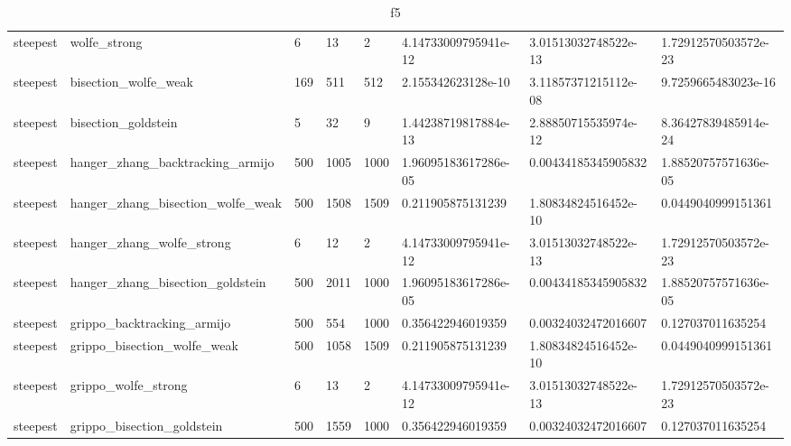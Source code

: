 \documentclass[a4paper,11pt]{article}
\numberwithin{equation}{section} %
\begin{document}
\begin{table}[h!]
{\begin{tabular}{|l|l|l|l|l|l|l|l|}
        steepest & wolfe\_strong & 6 & 13 & 2 & 4.14733009795941e-12 & 3.01513032748522e-13 & 1.72912570503572e-23 \\
        steepest & bisection\_wolfe\_weak & 169 & 511 & 512 & 2.155342623128e-10 & 3.11857371215112e-08 & 9.7259665483023e-16 \\
        steepest & bisection\_goldstein & 5 & 32 & 9 & 1.44238719817884e-13 & 2.88850715535974e-12 & 8.36427839485914e-24 \\
        steepest & hanger\_zhang\_backtracking\_armijo & 500 & 1005 & 1000 & 1.96095183617286e-05 & 0.00434185345905832 & 1.88520757571636e-05 \\
        steepest & hanger\_zhang\_bisection\_wolfe\_weak & 500 & 1508 & 1509 & 0.211905875131239 & 1.80834824516452e-10 & 0.0449040999151361 \\
        steepest & hanger\_zhang\_wolfe\_strong & 6 & 12 & 2 & 4.14733009795941e-12 & 3.01513032748522e-13 & 1.72912570503572e-23 \\
        steepest & hanger\_zhang\_bisection\_goldstein & 500 & 2011 & 1000 & 1.96095183617286e-05 & 0.00434185345905832 & 1.88520757571636e-05 \\
        steepest & grippo\_backtracking\_armijo & 500 & 554 & 1000 & 0.356422946019359 & 0.00324032472016607 & 0.127037011635254 \\
        steepest & grippo\_bisection\_wolfe\_weak & 500 & 1058 & 1509 & 0.211905875131239 & 1.80834824516452e-10 & 0.0449040999151361 \\
        steepest & grippo\_wolfe\_strong & 6 & 13 & 2 & 4.14733009795941e-12 & 3.01513032748522e-13 & 1.72912570503572e-23 \\
        steepest & grippo\_bisection\_goldstein & 500 & 1559 & 1000 & 0.356422946019359 & 0.00324032472016607 & 0.127037011635254 \\
\end{tabular}}
\caption{f5}
\label{table:f5}
\end{table}
\end{document}
